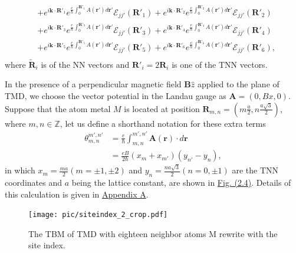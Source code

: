 \documentclass{report}
\begin{document}
\begin{equation}
\begin{aligned}
		 & + e^{i\mathbf{k\cdot}\mathbf{R}'_{1} }e^{\frac{e}{\hbar}\int_{0}^{\mathbf{R}'_{1}}A(\mathbf{r'})d\mathbf{r'}} \mathcal{E}_{jj'}(\mathbf{R}'_{1})+ e^{i\mathbf{k\cdot}\mathbf{R}'_{2} }e^{\frac{e}{\hbar}\int_{0}^{\mathbf{R}'_{2}}A(\mathbf{r'})d\mathbf{r'}} \mathcal{E}_{jj'}(\mathbf{R}'_{2})                                                 \\
		 & + e^{i\mathbf{k\cdot}\mathbf{R}'_{3} }e^{\frac{e}{\hbar}\int_{0}^{\mathbf{R}'_{3}}A(\mathbf{r'})d\mathbf{r'}} \mathcal{E}_{jj'}(\mathbf{R}'_{3})+ e^{i\mathbf{k\cdot}\mathbf{R}'_{4} }e^{\frac{e}{\hbar}\int_{0}^{\mathbf{R}'_{4}}A(\mathbf{r'})d\mathbf{r'}} \mathcal{E}_{jj'}(\mathbf{R}'_{4})                                                 \\
		 & + e^{i\mathbf{k\cdot}\mathbf{R}'_{5} }e^{\frac{e}{\hbar}\int_{0}^{\mathbf{R}'_{5}}A(\mathbf{r'})d\mathbf{r'}} \mathcal{E}_{jj'}(\mathbf{R}'_{5})+ e^{i\mathbf{k\cdot}\mathbf{R}'_{6} }e^{\frac{e}{\hbar}\int_{0}^{\mathbf{R}'_{6}}A(\mathbf{r'})d\mathbf{r'}} \mathcal{E}_{jj'}(\mathbf{R}'_{6})     ,                                            \\
	\end{aligned}
\end{equation}
where $\tilde{\mathbf{R}}_{i}$ is of the \ac{NN} vectors and $\mathbf{R}'_{i} = 2 \mathbf{R}_{i}$ is one of the \ac{TNN} vectors.

In the presence of a perpendicular magnetic field $\mathbf{B} \hat{z}$ applied to the plane of \ac{TMD}, we choose the vector potential in the Landau gauge as $\mathbf{A} = (0, Bx, 0)$. Suppose that the atom metal $M$ is located at position $\mathbf{R}_{m,n} = \left(m \frac{a}{2}, n \frac{a\sqrt{3}}{2}\right)$, where $m,n \in \mathbb{Z}$, let us define a shorthand notation for these extra terms
\begin{equation}
	\begin{aligned}
		\theta_{m,n}^{m',n'}
		 & = \frac{e}{\hbar} \int_{m,n}^{m',n'} \mathbf{A}(\mathbf{r}) \cdot d\mathbf{r} \\
		 & = \frac{eB}{2\hbar}(x_{m} + x_{m'})(y_{n'} - y_{n}),
	\end{aligned}
\end{equation}
in which $x_{m} = \frac{ma}{2}(m = \pm 1, \pm 2)$ and $y_{n} = \frac{na\sqrt{3}}{2}(n = 0,\pm 1)$ are the \ac{TNN} coordinates and $a$ being the lattice constant, are shown in \hyperref[fig:site index]{Fig. (2.4)}. Details of this calculation is given in \hyperref[appendix a]{Appendix A}.
\begin{figure}[H]
	\centering
	\texttt{[image: pic/siteindex\_2\_crop.pdf]}
	\caption[TMD with six neighbors atom M rewrite with the site index.]{\label{fig:site index} The \ac{TBM} of \ac{TMD} with eighteen neighbor atoms M rewrite with the site index.}
\end{figure}
\end{document}

